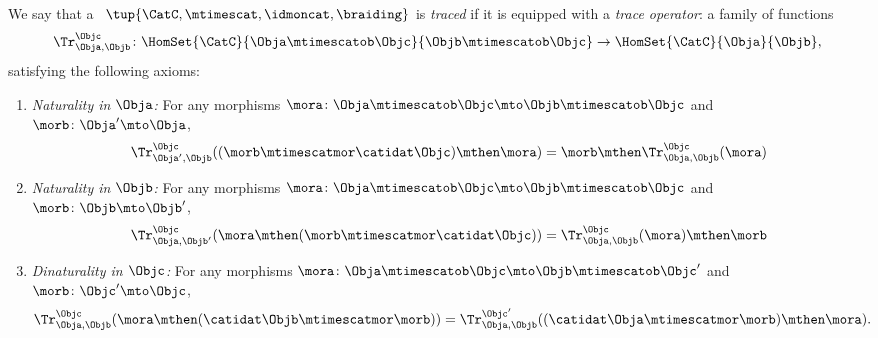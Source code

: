 \begin{ctdefinition}
    \label{def:traced-strict-monoidal-cat}
    \label{def:traced-strict-monoidal-category}
    We say that a ~$\tup{\CatC, \mtimescat, \idmoncat, \braiding}$ is \emph{traced} if it is equipped with a \emph{trace operator}: a family of functions
    \begin{equation}
        \Tr_{\Obja,\Objb}^\Objc\colon \HomSet{\CatC}{\Obja \mtimescatob \Objc}{\Objb\mtimescatob \Objc}\to \HomSet{\CatC}{\Obja}{\Objb},
    \end{equation}
    satisfying the following axioms:
    \begin{enumerate}
        \item \emph{Naturality in $\Obja$:} For any morphisms $\mora\colon \Obja\mtimescatob \Objc \mto \Objb\mtimescatob \Objc$ and $\morb \colon \Obja' \mto \Obja$,
              \begin{equation}\label{eq:trace-naturality-1}
                  \Tr_{\Obja', \Objb}^\Objc ( (\morb \mtimescatmor \catidat\Objc) \mthen \mora) = \morb \mthen \Tr_{\Obja, \Objb}^\Objc (\mora)
              \end{equation}
        \item \emph{Naturality in $\Objb$:} For any morphisms $\mora\colon \Obja\mtimescatob \Objc \mto \Objb\mtimescatob \Objc$ and $\morb \colon \Objb \mto \Objb'$,
              \begin{equation}\label{eq:trace-naturality-2}
                  \Tr_{\Obja, \Objb'}^\Objc ( \mora \mthen (\morb \mtimescatmor \catidat\Objc) ) = \Tr_{\Obja, \Objb}^\Objc (\mora) \mthen \morb
              \end{equation}
        \item \emph{Dinaturality in $\Objc$:}
              For any morphisms $\mora \colon \Obja  \mtimescatob \Objc \mto \Objb \mtimescatob \Objc'$ and $\morb \colon \Objc' \mto \Objc$,
              \begin{equation}\label{eq:trace-dinaturality}
                  \Tr_{\Obja, \Objb}^{\Objc} (\mora \mthen (\catidat\Objb \mtimescatmor \morb)) = \Tr_{\Obja, \Objb}^{\Objc'}((\catidat\Obja \mtimescatmor \morb) \mthen \mora).
              \end{equation}


\end{enumerate}
\end{ctdefinition}
